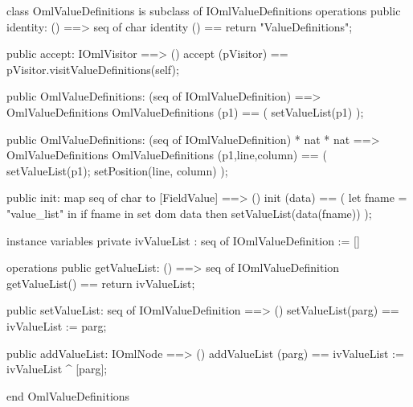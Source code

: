 \begin{vdm_al}
class OmlValueDefinitions is subclass of IOmlValueDefinitions
operations
  public identity: () ==> seq of char
  identity () == return "ValueDefinitions";

  public accept: IOmlVisitor ==> ()
  accept (pVisitor) == pVisitor.visitValueDefinitions(self);

  public OmlValueDefinitions:
    (seq of IOmlValueDefinition) ==> OmlValueDefinitions
  OmlValueDefinitions (p1) == 
    ( setValueList(p1) );

  public OmlValueDefinitions:
    (seq of IOmlValueDefinition) *
    nat *
    nat ==> OmlValueDefinitions
  OmlValueDefinitions (p1,line,column) == 
    ( setValueList(p1);
      setPosition(line, column) );

  public init: map seq of char to [FieldValue] ==> ()
  init (data) ==
    ( let fname = "value_list" in
        if fname in set dom data
        then setValueList(data(fname)) );

instance variables
  private ivValueList : seq of IOmlValueDefinition := []

operations
  public getValueList: () ==> seq of IOmlValueDefinition
  getValueList() == return ivValueList;

  public setValueList: seq of IOmlValueDefinition ==> ()
  setValueList(parg) == ivValueList := parg;

  public addValueList: IOmlNode ==> ()
  addValueList (parg) == ivValueList := ivValueList ^ [parg];

end OmlValueDefinitions
\end{vdm_al}

